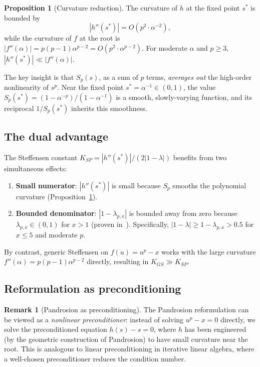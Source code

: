 \documentclass[11pt,a4paper]{article}
\theoremstyle{definition}
\newtheorem{proposition}{Proposition}[section]
\newtheorem{remark}{Remark}[section]
\begin{document}
\begin{proposition}[Curvature reduction]
\label{prop:curvature}
The curvature of $h$ at the fixed point $s^*$ is bounded by
\begin{equation}
  \label{eq:curvature_bound}
  |h''(s^*)| = O(p^2 \cdot \alpha^{-2}),
\end{equation}
while the curvature of $f$ at the root is $|f''(\alpha)| = p(p-1)\alpha^{p-2} = O(p^2 \cdot \alpha^{p-2})$.  For moderate $\alpha$ and $p \geq 3$, $|h''(s^*)| \ll |f''(\alpha)|$.
\end{proposition}

The key insight is that $S_p(s)$, as a sum of $p$ terms, \emph{averages out} the high-order nonlinearity of $s^p$.  Near the fixed point $s^* = \alpha^{-1} \in (0,1)$, the value $S_p(s^*) = (1 - \alpha^{-p})/(1 - \alpha^{-1})$ is a smooth, slowly-varying function, and its reciprocal $1/S_p(s^*)$ inherits this smoothness.

\subsection{The dual advantage}

The Steffensen constant $K_{SP} = |h''(s^*)|/(2|1-\lambda|)$ benefits from two simultaneous effects:

\begin{enumerate}
  \item \textbf{Small numerator}: $|h''(s^*)|$ is small because $S_p$ smooths the polynomial curvature (Proposition~\ref{prop:curvature}).
  \item \textbf{Bounded denominator}: $|1 - \lambda_{p,x}|$ is bounded away from zero because $\lambda_{p,x} \in (0,1)$ for $x > 1$ (proven in~\cite{besevic2026}).  Specifically, $|1 - \lambda| \geq 1 - \lambda_{p,x} > 0.5$ for $x \leq 5$ and moderate $p$.
\end{enumerate}

By contrast, generic Steffensen on $f(u) = u^p - x$ works with the large curvature $f''(\alpha) = p(p-1)\alpha^{p-2}$ directly, resulting in $K_{GS} \gg K_{SP}$.

\subsection{Reformulation as preconditioning}

\begin{remark}[Pandrosion as preconditioning]
The Pandrosion reformulation can be viewed as a \emph{nonlinear preconditioner}: instead of solving $u^p - x = 0$ directly, we solve the preconditioned equation $h(s) - s = 0$, where $h$ has been engineered (by the geometric construction of Pandrosion) to have small curvature near the root.  This is analogous to linear preconditioning in iterative linear algebra, where a well-chosen preconditioner reduces the condition number.
\end{remark}
\end{document}
